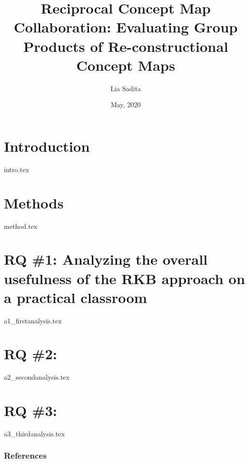 \documentclass[notes]{beamer}
\title[Reciprocal Concept Map Collaboration]{
Reciprocal Concept Map Collaboration: Evaluating Group Products of Re-constructional Concept Maps
}
\author{Lia Sadita}
\institute{Hiroshima University}
\date{May, 2020}
\begin{document}
\begin{frame}
  \titlepage
\end{frame}



\section{Introduction}
{intro.tex}

\section{Methods}
{method.tex}

\section{RQ \#1: Analyzing the overall usefulness of the RKB approach on a practical classroom}
{a1_firstanalysis.tex}

\section{RQ \#2: }
{a2_secondanalysis.tex}

\section{RQ \#3: }
{a3_thirdanalysis.tex}


\begin{frame}[allowframebreaks]
\frametitle{References}

\printbibliography
\end{frame}
\end{document}
